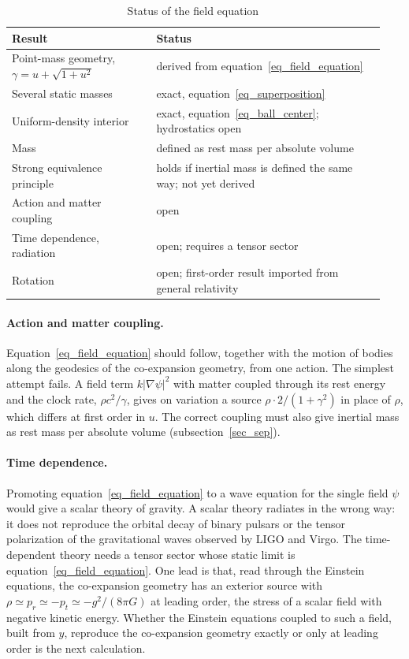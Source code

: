 \begin{table}[h]
\caption{Status of the field equation}
\label{table_field_equation}
\begin{tabular}{@{}p{0.36\linewidth}p{0.58\linewidth}@{}}
\toprule
Result & Status\\
\midrule
Point-mass geometry, $\gamma=u+\sqrt{1+u^2}$ & derived from equation~\eqref{eq_field_equation}\\
Several static masses & exact, equation~\eqref{eq_superposition}\\
Uniform-density interior & exact, equation~\eqref{eq_ball_center}; hydrostatics open\\
Mass & defined as rest mass per absolute volume\\
Strong equivalence principle & holds if inertial mass is defined the same way; not yet derived\\
Action and matter coupling & open\\
Time dependence, radiation & open; requires a tensor sector\\
Rotation & open; first-order result imported from general relativity\\
\bottomrule
\end{tabular}
\end{table}

\paragraph{Action and matter coupling.} Equation~\eqref{eq_field_equation} should follow, together with the motion of bodies along the geodesics of the co-expansion geometry, from one action. The simplest attempt fails. A field term $k|\nabla\psi|^2$ with matter coupled through its rest energy and the clock rate, $\rho c^2/\gamma$, gives on variation a source $\rho\cdot2/(1+\gamma^2)$ in place of $\rho$, which differs at first order in $u$. The correct coupling must also give inertial mass as rest mass per absolute volume (subsection~\ref{sec_sep}).

\paragraph{Time dependence.} Promoting equation~\eqref{eq_field_equation} to a wave equation for the single field $\psi$ would give a scalar theory of gravity. A scalar theory radiates in the wrong way: it does not reproduce the orbital decay of binary pulsars or the tensor polarization of the gravitational waves observed by LIGO and Virgo. The time-dependent theory needs a tensor sector whose static limit is equation~\eqref{eq_field_equation}. One lead is that, read through the Einstein equations, the co-expansion geometry has an exterior source with $\rho\simeq p_r\simeq-p_t\simeq-g^2/(8\pi G)$ at leading order, the stress of a scalar field with negative kinetic energy. Whether the Einstein equations coupled to such a field, built from $y$, reproduce the co-expansion geometry exactly or only at leading order is the next calculation.
